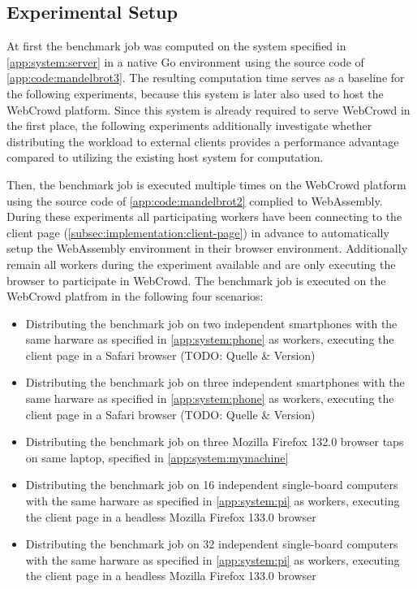 \subsection{Experimental Setup}
At first the benchmark job was computed on the system specified in \autoref{app:system:server} in a native Go environment using the source code of \autoref{app:code:mandelbrot3}. The resulting computation time serves as a baseline for the following experiments, because this system is later also used to host the WebCrowd platform. Since this system is already required to serve WebCrowd in the first place, the following experiments additionally investigate whether distributing the workload to external clients provides a performance advantage compared to utilizing the existing host system for computation.

Then, the benchmark job is executed multiple times on the WebCrowd platform using the source code of \autoref{app:code:mandelbrot2} complied to WebAssembly. During these experiments all participating workers have been connecting to the client page (\autoref{subsec:implementation:client-page}) in advance to automatically setup the WebAssembly environment in their browser environment. Additionally remain all workers during the experiment available and are only executing the browser to participate in WebCrowd. The benchmark job is executed on the WebCrowd platfrom in the following four scenarios:
\begin{itemize}
    \item Distributing the benchmark job on two independent smartphones with the same harware as specified in \autoref{app:system:phone} as workers, executing the client page in a Safari browser (TODO: Quelle \& Version)
    \item Distributing the benchmark job on three independent smartphones with the same harware as specified in \autoref{app:system:phone} as workers, executing the client page in a Safari browser (TODO: Quelle \& Version)
    \item Distributing the benchmark job on three Mozilla Firefox 132.0 \cite{background:firefox} browser taps on same laptop, specified in \autoref{app:system:mymachine}
    \item Distributing the benchmark job on 16 independent single-board computers with the same harware as specified in \autoref{app:system:pi} as workers, executing the client page in a headless Mozilla Firefox 133.0 \cite{background:firefox2} browser
    \item Distributing the benchmark job on 32 independent single-board computers with the same harware as specified in \autoref{app:system:pi} as workers, executing the client page in a headless Mozilla Firefox 133.0 \cite{background:firefox2} browser
\end{itemize}

